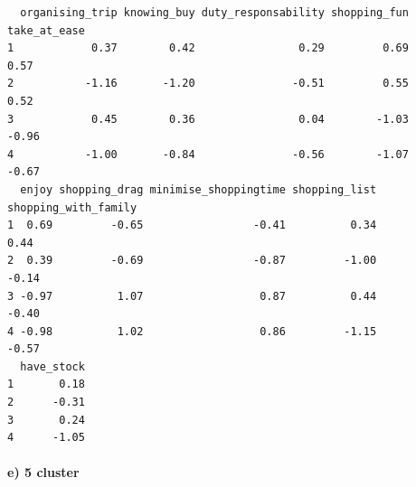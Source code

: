 \documentclass[
  11pt,
]{article}
\newenvironment{Shaded}{\begin{snugshade}}{\end{snugshade}}
\newcommand{\AttributeTok}[1]{\textcolor[rgb]{0.77,0.63,0.00}{#1}}
\newcommand{\CommentTok}[1]{\textcolor[rgb]{0.56,0.35,0.01}{\textit{#1}}}
\newcommand{\ConstantTok}[1]{\textcolor[rgb]{0.00,0.00,0.00}{#1}}
\newcommand{\DecValTok}[1]{\textcolor[rgb]{0.00,0.00,0.81}{#1}}
\newcommand{\FunctionTok}[1]{\textcolor[rgb]{0.00,0.00,0.00}{#1}}
\newcommand{\NormalTok}[1]{#1}
\newcommand{\OtherTok}[1]{\textcolor[rgb]{0.56,0.35,0.01}{#1}}
\newcommand{\SpecialCharTok}[1]{\textcolor[rgb]{0.00,0.00,0.00}{#1}}
\newcommand{\StringTok}[1]{\textcolor[rgb]{0.31,0.60,0.02}{#1}}
\begin{document}
\begin{Shaded}
\end{Shaded}

\begin{verbatim}
  organising_trip knowing_buy duty_responsability shopping_fun take_at_ease
1            0.37        0.42                0.29         0.69         0.57
2           -1.16       -1.20               -0.51         0.55         0.52
3            0.45        0.36                0.04        -1.03        -0.96
4           -1.00       -0.84               -0.56        -1.07        -0.67
  enjoy shopping_drag minimise_shoppingtime shopping_list shopping_with_family
1  0.69         -0.65                 -0.41          0.34                 0.44
2  0.39         -0.69                 -0.87         -1.00                -0.14
3 -0.97          1.07                  0.87          0.44                -0.40
4 -0.98          1.02                  0.86         -1.15                -0.57
  have_stock
1       0.18
2      -0.31
3       0.24
4      -1.05
\end{verbatim}

\hypertarget{e-5-cluster}{%
\paragraph{e) 5 cluster}\label{e-5-cluster}}
\end{document}
